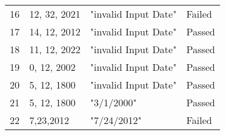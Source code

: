 \begin{table}[!htb]
\begin{tabular}{|l|l|l|l|}
        16                   & 12, 32, 2021 & "invalid Input Date"   &  Failed       \\ 
        17                   & 14, 12, 2012 & "invalid Input Date"   &  Passed       \\ 
        18                   & 11, 12, 2022 & "invalid Input Date"   &  Passed       \\ 
        19                   & 0, 12, 2002  & "invalid Input Date"   &  Passed       \\ 
        20                   & 5, 12, 1800  & "invalid Input Date"   &  Passed       \\ 
        21                   & 5, 12, 1800  & "3/1/2000"             &  Passed       \\ 
        22                   & 7,23,2012    & "7/24/2012"            &  Failed       \\
        \hline
    \end{tabular}
\end{table}






